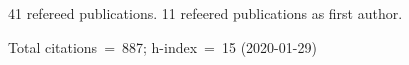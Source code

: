 41 refereed publications. 11 refeered publications as first author.

Total citations~=~887; h-index~=~15 (2020-01-29)